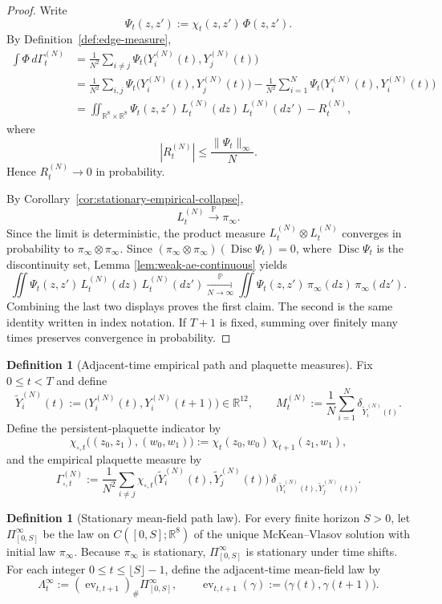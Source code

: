 \documentclass[11pt]{article}
\theoremstyle{definition}
\newtheorem{definition}[theorem]{Definition}
\theoremstyle{remark}
\newcommand{\R}{\mathbb R}
\begin{document}
\begin{proof}
Write
\[
\Psi_t(z,z'):=\chi_t(z,z')\,\Phi(z,z').
\]
By Definition~\ref{def:edge-measure},
\begin{align*}
\int \Phi\,d\Gamma_t^{(N)}
&=
\frac1{N^2}\sum_{i\neq j}\Psi_t\!\bigl(Y_i^{(N)}(t),Y_j^{(N)}(t)\bigr)\\
&=
\frac1{N^2}\sum_{i,j}\Psi_t\!\bigl(Y_i^{(N)}(t),Y_j^{(N)}(t)\bigr)
-\frac1{N^2}\sum_{i=1}^N\Psi_t\!\bigl(Y_i^{(N)}(t),Y_i^{(N)}(t)\bigr)\\
&=
\iint_{\R^8\times\R^8}\Psi_t(z,z')\,L_t^{(N)}(dz)\,L_t^{(N)}(dz')
-R_t^{(N)},
\end{align*}
where
\[
|R_t^{(N)}|
\le
\frac{\|\Psi_t\|_\infty}{N}.
\]
Hence \(R_t^{(N)}\to0\) in probability.

By Corollary~\ref{cor:stationary-empirical-collapse},
\[
L_t^{(N)}\xrightarrow{\mathbb P}\pi_\infty.
\]
Since the limit is deterministic, the product measure
\(L_t^{(N)}\otimes L_t^{(N)}\) converges in probability to
\(\pi_\infty\otimes\pi_\infty\).
Since \((\pi_\infty\otimes\pi_\infty)(\operatorname{Disc}\Psi_t)=0\),
where \(\operatorname{Disc}\Psi_t\) is the discontinuity set, Lemma
\ref{lem:weak-ae-continuous} yields
\[
\iint \Psi_t(z,z')\,L_t^{(N)}(dz)\,L_t^{(N)}(dz')
\xrightarrow[N\to\infty]{\mathbb P}
\iint \Psi_t(z,z')\,\pi_\infty(dz)\,\pi_\infty(dz').
\]
Combining the last two displays proves the first claim.
The second is the same identity written in index notation.
If \(T+1\) is fixed, summing over finitely many times preserves convergence in
probability.
\end{proof}

\begin{definition}[Adjacent-time empirical path and plaquette measures]
\label{def:plaquette-measure}
Fix \(0\le t<T\) and define
\[
\widetilde Y_i^{(N)}(t)
:=
\bigl(Y_i^{(N)}(t),Y_i^{(N)}(t+1)\bigr)\in\R^{12},
\qquad
M_t^{(N)}
:=
\frac1N\sum_{i=1}^N \delta_{\widetilde Y_i^{(N)}(t)}.
\]
Define the persistent-plaquette indicator by
\[
\chi_{\square,t}\bigl((z_0,z_1),(w_0,w_1)\bigr)
:=
\chi_t(z_0,w_0)\,\chi_{t+1}(z_1,w_1),
\]
and the empirical plaquette measure by
\[
\Gamma_{\square,t}^{(N)}
:=
\frac1{N^2}\sum_{i\neq j}
\chi_{\square,t}\!\bigl(\widetilde Y_i^{(N)}(t),\widetilde Y_j^{(N)}(t)\bigr)\,
\delta_{\bigl(\widetilde Y_i^{(N)}(t),\widetilde Y_j^{(N)}(t)\bigr)}.
\]
\end{definition}

\begin{definition}[Stationary mean-field path law]
\label{def:stationary-path-law}
For every finite horizon \(S>0\), let \(\Pi_{[0,S]}^\infty\) be the law on
\(C([0,S];\R^8)\) of the unique McKean--Vlasov solution with initial law
\(\pi_\infty\).
Because \(\pi_\infty\) is stationary, \(\Pi_{[0,S]}^\infty\) is stationary under
time shifts.
For each integer \(0\le t\le\lfloor S\rfloor-1\), define the adjacent-time mean-field law by
\[
\Lambda_t^\infty
:=
(\operatorname{ev}_{t,t+1})_\#\Pi_{[0,S]}^\infty,
\qquad
\operatorname{ev}_{t,t+1}(\gamma):=\bigl(\gamma(t),\gamma(t+1)\bigr).
\]
\end{definition}
\end{document}
